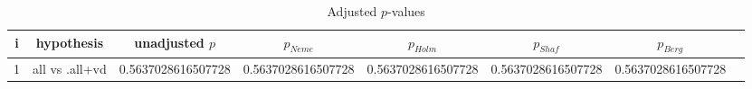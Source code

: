 \documentclass[a4paper,10pt]{article}
\begin{document}
\begin{landscape}
\begin{itemize}


\end{itemize}


\begin{table}[!htp]
\centering\tiny
\caption{Adjusted $p$-values}
\begin{tabular}{cccccccc}
i&hypothesis&unadjusted $p$&$p_{Neme}$&$p_{Holm}$&$p_{Shaf}$&$p_{Berg}$\\
\hline
1&all vs .all+vd&0.5637028616507728&0.5637028616507728&0.5637028616507728&0.5637028616507728&0.5637028616507728\\\hline
\end{tabular}
\end{table}

\end{landscape}
\end{document}
